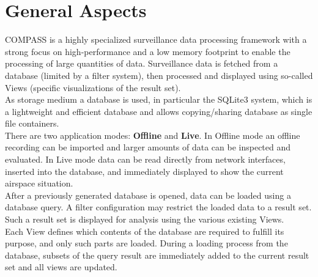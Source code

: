 \section{General Aspects}
COMPASS is a highly specialized surveillance data processing framework with a strong focus on high-performance and a low memory footprint to enable the processing of large quantities of data. Surveillance data is fetched from a database (limited by a filter system), then processed and displayed using so-called Views (specific visualizations of the result set).\\

As storage medium a database is used, in particular the SQLite3 system, which is a lightweight and efficient database and allows copying/sharing database as single file containers. \\

There are two application modes: \textbf{Offline} and \textbf{Live}. In Offline mode an offline recording can be imported and larger amounts of data can be inspected and evaluated. 
In Live mode data can be read directly from network interfaces, inserted into the database, and immediately displayed to show the current airspace situation. \\

After a previously generated database is opened, data can be loaded using a database query. A filter configuration may restrict the loaded data to a result set. 
Such a result set is displayed for analysis using the various existing Views.\\

Each View defines which contents of the database are required to fulfill its purpose, and only such parts are loaded.  During a loading process from the database, subsets of the query result are immediately added to the current result set and all views are updated.  
